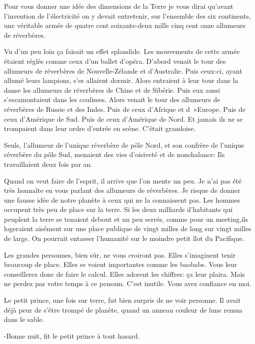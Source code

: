 \documentclass{report}
\begin{document}
Pour vous donner une idée des dimensions de la Terre je vous dirai qu'avant l'invention de l'électricité on y devait entretenir, sur l'ensemble des six continents, une véritable armée de quatre cent soixante-deux mille cinq cent onze allumeurs de réverbères.

Vu d'un peu loin ça faisait un effet splandide. Les mouvements de cette armée étaient réglés comme ceux d'un ballet d'opéra. D'abord venait le tour des allumeurs de réverbères de Nouvelle-Zélande et d'Australie. Puis ceux-ci, ayant allumé leurs lampions, s'es allaient dormir. Alors entraient à leur tour dans la danse les allumeurs de réverbères de Chine et de Sibérie. Puis eux aussi s'escamontaient dans les coulisses. Alors venait le tour des allumeurs de réverbères de Russie et des Indes. Puis de ceux d'Afrique et d~»Europe. Puis de ceux d'Amérique de Sud. Puis de ceux d'Amérique de Nord. Et jamais ils ne se trompaient dans leur ordre d'entrée en scène. C'était grandoise.

Seuls, l'allumeur de l'unique réverbère de pôle Nord, et son confrère de l'unique réverbère du pôle Sud, menaient des vies d'oisiveté et de nonchalance: Ils travaillaient deux fois par an.


\parachapter{} %
Quand on veut faire de l'esprit, il arrive que l'on mente un peu. Je n'ai pas été très honnaîte en vous parlant des allumeurs de réverbères. Je risque de donner une fausse idée de notre planète à ceux qui ne la connaissent pas. Les hommes occupent très peu de place sur la terre. Si les deux milliards d'habitants qui peuplent la terre se tenaient debout et un peu serrés, comme pour un meeting,ils logeraient aisément sur une place publique de vingt milles de long sur vingt milles de large. On pourrait entasser l'humanité sur le moindre petit îlot du Pacifique.

Les grandes personnes, bien sûr, ne vous croiront pas. Elles s'imaginent tenir beaucoup de place. Elles se voient importantes comme les baobabs. Vous leur conseillerez donc de faire le calcul. Elles adorent les chiffres: ça leur plaira. Mais ne perdez pas votre temps à ce pensum. C'est inutile. Vous avez confiance en moi.

Le petit prince, une fois sur terre, fut bien surpris de ne voir personne. Il avait déjà peur de s'être trompé de planète, quand un anneau couleur de lune remua dans le sable.

-Bonne nuit, fit le petit prince à tout hasard.
\end{document}
